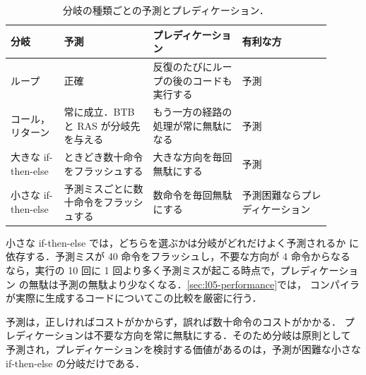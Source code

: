 \documentclass[../main.tex]{subfiles}
\begin{document}
\begin{table}[tb]
  \centering\small
  \caption{分岐の種類ごとの予測とプレディケーション．}
  \label{tab:l05-which}
  \begin{tabular}{@{}>{\raggedright\arraybackslash}p{0.15\linewidth}>{\raggedright\arraybackslash}p{0.25\linewidth}>{\raggedright\arraybackslash}p{0.25\linewidth}>{\raggedright\arraybackslash}p{0.25\linewidth}@{}}
    \toprule
    分岐 & 予測 & プレディケーション & 有利な方 \\
    \midrule
    ループ               & 正確
                         & 反復のたびにループの後のコードも実行する
                         & 予測 \\
    \addlinespace
    コール，\newline リターン & 常に成立．BTB と RAS が分岐先を与える
                         & もう一方の経路の処理が常に無駄になる
                         & 予測 \\
    \addlinespace
    大きな if-then-else & ときどき数十命令をフラッシュする
                         & 大きな方向を毎回無駄にする
                         & 予測 \\
    \addlinespace
    小さな if-then-else & 予測ミスごとに数十命令をフラッシュする
                         & 数命令を毎回無駄にする
                         & 予測困難なら\newline プレディケーション \\
    \bottomrule
  \end{tabular}
\end{table}

小さな if-then-else では，どちらを選ぶかは分岐がどれだけよく予測されるか
に依存する．予測ミスが 40 命令をフラッシュし，不要な方向が 4 命令からなる
なら，実行の 10 回に 1 回より多く予測ミスが起こる時点で，プレディケーション
の無駄は予測の無駄より少なくなる．\cref{sec:l05-performance}では，
コンパイラが実際に生成するコードについてこの比較を厳密に行う．

\begin{keypoint}
  予測は，正しければコストがかからず，誤れば数十命令のコストがかかる．
  プレディケーションは不要な方向を常に無駄にする．そのため分岐は原則として
  予測され，プレディケーションを検討する価値があるのは，予測が困難な小さな
  if-then-else の分岐だけである．
\end{keypoint}
\end{document}
